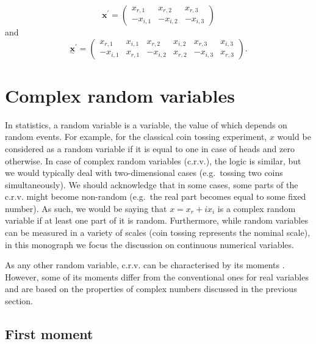 \documentclass[
]{book}
\begin{document}
\begin{equation}
    {\mathbf{x}}^{\prime} = \begin{pmatrix} x_{r,1} & x_{r,2} & x_{r,3} \\
                                         -x_{i,1} & -x_{i,2} & -x_{i,3}
                        \end{pmatrix} 
    \label{eq:complexVectorMatrixTransposedConj}
\end{equation}
and
\begin{equation}
    \underset{\sim}{\mathbf{x}}^{\prime} = \begin{pmatrix} x_{r,1} & x_{i,1} & x_{r,2} & x_{i,2} & x_{r,3} & x_{i,3} \\
                                        -x_{i,1} & x_{r,1} & -x_{i,2} & x_{r,2} & -x_{i,3} & x_{r,3}
                        \end{pmatrix} .
    \label{eq:complexMatrixTransposedConj}
\end{equation}

\hypertarget{complexRandomVariable}{%
\section{Complex random variables}\label{complexRandomVariable}}

In statistics, a random variable is a variable, the value of which depends on random events. For example, for the classical coin tossing experiment, \(x\) would be considered as a random variable if it is equal to one in case of heads and zero otherwise. In case of complex random variables (c.r.v.), the logic is similar, but we would typically deal with two-dimensional cases (e.g.~tossing two coins simultaneously). We should acknowledge that in some cases, some parts of the c.r.v. might become non-random (e.g.~the real part becomes equal to some fixed number). As such, we would be saying that \(x=x_r+ix_i\) is a complex random variable if at least one part of it is random. Furthermore, while random variables can be measured in a variety of scales (coin tossing represents the nominal scale), in this monograph we focus the discussion on continuous numerical variables.

As any other random variable, c.r.v. can be characterised by its moments \citep[see, for example,][]{Reed1962}. However, some of its moments differ from the conventional ones for real variables and are based on the properties of complex numbers discussed in the previous section.

\hypertarget{first-moment}{%
\subsection{First moment}\label{first-moment}}
\end{document}
